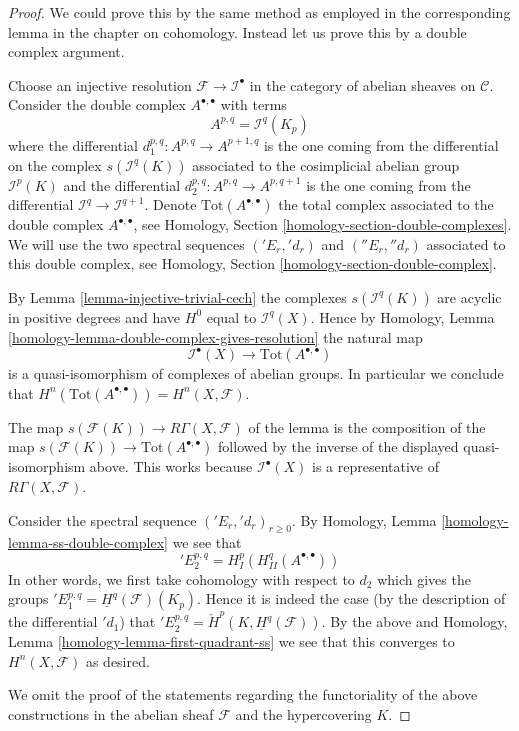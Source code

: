 \documentclass{stacks-project}
\theoremstyle{plain}
\theoremstyle{definition}
\theoremstyle{remark}
\numberwithin{equation}{subsection}
\begin{document}
\begin{proof}
We could prove this by the same method as employed in the corresponding
lemma in the chapter on cohomology. Instead let us prove this by a
double complex argument.

\medskip\noindent
Choose an injective resolution $\mathcal{F} \to \mathcal{I}^\bullet$
in the category of abelian sheaves on $\mathcal{C}$. Consider the
double complex $A^{\bullet, \bullet}$ with terms
$$
A^{p, q} = \mathcal{I}^q(K_p)
$$
where the differential $d_1^{p, q} : A^{p, q} \to A^{p + 1, q}$ is the one
coming from the differential on the complex $s(\mathcal{I}^q(K))$
associated to the cosimplicial abelian group $\mathcal{I}^p(K)$
and the differential $d_2^{p, q} : A^{p, q} \to A^{p, q + 1}$ is the one
coming from the differential $\mathcal{I}^q \to \mathcal{I}^{q + 1}$.
Denote $\text{Tot}(A^{\bullet, \bullet})$ the total complex associated to
the double complex $A^{\bullet, \bullet}$, see
Homology, Section \ref{homology-section-double-complexes}.
We will use the two spectral
sequences $({}'E_r, {}'d_r)$ and $({}''E_r, {}''d_r)$
associated to this double complex, see
Homology, Section \ref{homology-section-double-complex}.

\medskip\noindent
By Lemma \ref{lemma-injective-trivial-cech}
the complexes $s(\mathcal{I}^q(K))$ are acyclic in
positive degrees and have $H^0$ equal to $\mathcal{I}^q(X)$.
Hence by
Homology, Lemma \ref{homology-lemma-double-complex-gives-resolution}
the natural map
$$
\mathcal{I}^\bullet(X) \longrightarrow \text{Tot}(A^{\bullet, \bullet})
$$
is a quasi-isomorphism of complexes of abelian groups. In particular
we conclude that $H^n(\text{Tot}(A^{\bullet, \bullet})) = H^n(X, \mathcal{F})$.

\medskip\noindent
The map $s(\mathcal{F}(K)) \longrightarrow R\Gamma(X, \mathcal{F})$ of
the lemma is the composition of the map
$s(\mathcal{F}(K)) \to \text{Tot}(A^{\bullet, \bullet})$
followed by the inverse
of the displayed quasi-isomorphism above. This works because
$\mathcal{I}^\bullet(X)$ is a representative of $R\Gamma(X, \mathcal{F})$.

\medskip\noindent
Consider the spectral sequence $({}'E_r, {}'d_r)_{r \geq 0}$. By
Homology, Lemma \ref{homology-lemma-ss-double-complex}
we see that
$$
{}'E_2^{p, q} = H^p_I(H^q_{II}(A^{\bullet, \bullet}))
$$
In other words, we first take cohomology with respect to
$d_2$ which gives the groups
${}'E_1^{p, q} = \underline{H}^q(\mathcal{F})(K_p)$.
Hence it is indeed the case (by the description of the differential
${}'d_1$) that
${}'E_2^{p, q} = \check{H}^p(K, \underline{H}^q(\mathcal{F}))$.
By the above and Homology, Lemma \ref{homology-lemma-first-quadrant-ss}
we see that this converges to $H^n(X, \mathcal{F})$ as desired.

\medskip\noindent
We omit the proof of the statements regarding the functoriality of
the above constructions in the abelian sheaf $\mathcal{F}$ and the
hypercovering $K$.
\end{proof}
\end{document}
